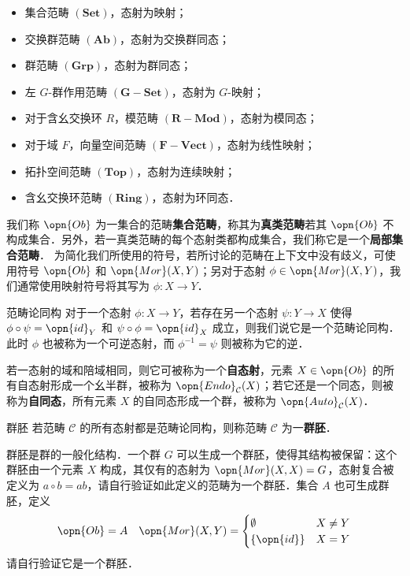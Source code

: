 \begin{itemize}
    \item 集合范畴 $(\mathbf{Set})$，态射为映射；
    \item 交换群范畴 $(\mathbf{Ab})$，态射为交换群同态；
    \item 群范畴 $(\mathbf{Grp})$，态射为群同态；
    \item 左 $G$-群作用范畴 $(\mathbf{G{-}Set})$，态射为 $G$-映射；
    \item 对于含幺交换环 $R$，模范畴 $(\mathbf{R{-}Mod})$，态射为模同态；
    \item 对于域 $F$，向量空间范畴 $(\mathbf{F{-}Vect})$，态射为线性映射；
    \item 拓扑空间范畴 $(\mathbf{Top})$，态射为连续映射；
    \item 含幺交换环范畴 $(\mathbf{Ring})$，态射为环同态．
\end{itemize}
我们称 $\opn{Ob}$ 为一集合的范畴\textbf{集合范畴}，称其为\textbf{真类范畴}若其 $\opn{Ob}$ 不构成集合．另外，若一真类范畴的每个态射类都构成集合，我们称它是一个\textbf{局部集合范畴}．
为简化我们所使用的符号，若所讨论的范畴在上下文中没有歧义，可使用符号 $\opn{Ob}$ 和 $\opn{Mor}(X,Y)$；另对于态射 $\phi\in\opn{Mor}(X,Y)$，我们通常使用映射符号将其写为 $\phi:X\to Y$．

\begin{definition}{范畴论同构}
对于一个态射 $\phi:X\to Y$，若存在另一个态射 $\psi:Y\to X$ 使得 $\phi\circ\psi=\opn{id}_Y$ 和 $\psi\circ\phi=\opn{id}_X$ 成立，则我们说它是一个范畴论同构．此时 $\phi$ 也被称为一个可逆态射，而 $\phi^{-1}=\psi$ 则被称为它的逆．
\end{definition}
若一态射的域和陪域相同，则它可被称为一个\textbf{自态射}，元素 $X\in\opn{Ob}$ 的所有自态射形成一个幺半群，被称为 $\opn{Endo}_\mathcal{C}(X)$；若它还是一个同态，则被称为\textbf{自同态}，所有元素 $X$ 的自同态形成一个群，被称为 $\opn{Auto}_\mathcal{C}(X)$．

\begin{definition}{群胚}
若范畴 $\mathcal{C}$ 的所有态射都是范畴论同构，则称范畴 $\mathcal{C}$ 为一\textbf{群胚}．
\end{definition}
群胚是群的一般化结构．一个群 $G$ 可以生成一个群胚，使得其结构被保留：这个群胚由一个元素 $X$ 构成，其仅有的态射为 $\opn{Mor}(X,X)=G$，态射复合被定义为 $a\circ b=ab$，请自行验证如此定义的范畴为一个群胚．集合 $A$ 也可生成群胚，定义
\begin{equation}
\opn{Ob}=A\quad\opn{Mor}(X,Y)=\begin{cases}\emptyset&X\neq Y\\\{\opn{id}\}&X=Y\end{cases}
\end{equation}
请自行验证它是一个群胚．

